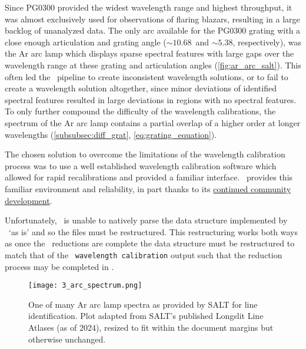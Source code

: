 Since PG$0300$ provided the widest wavelength range and highest throughput, it was almost exclusively used for observations of flaring blazars, resulting in a large backlog of unanalyzed data. The only arc available for the PG$0300$ grating with a close enough articulation and grating angle ($\sim 10.68$\degree\ and $\sim 5.38$\degree, respectively), was the \gls{Ar} arc lamp which displays sparse spectral features with large gaps over the wavelength range at these grating and articulation angles (\autoref{fig:ar_arc_salt}). This often led the \polsalt\ pipeline to create inconsistent wavelength solutions, or to fail to create a wavelength solution altogether, since minor deviations of identified spectral features resulted in large deviations in regions with no spectral features. To only further compound the difficulty of the wavelength calibrations, the spectrum of the \gls{Ar} arc lamp contains a partial overlap of a higher order at longer wavelengths (\autoref{subsubsec:diff_grat}, \autoref{eq:grating_equation}).

The chosen solution to overcome the limitations of the wavelength calibration process was to use a well established wavelength calibration software which allowed for rapid recalibrations and provided a familiar interface. \iraf\ provides this familiar environment and reliability, in part thanks to its \href{https://github.com/iraf-community/iraf}{continued community development}.

Unfortunately, \iraf\ is unable to natively parse the data structure implemented by \polsalt\ `as is' and so the files must be restructured. This restructuring works both ways as once the \iraf\ reductions are complete the data structure must be restructured to match that of the \polsalt\ \texttt{wavelength calibration} output such that the reduction process may be completed in \polsalt.

\begin{figure}[t]
    \centering
    \texttt{[image: 3\_arc\_spectrum.png]}
    \caption{One of many \gls{Ar} arc lamp spectra as provided by \gls{SALT} for line identification. Plot adapted from \gls{SALT}'s published Longslit Line Atlases (as of 2024), resized to fit within the document margins but otherwise unchanged.\protect\footnotemark}
    \label{fig:ar_arc_salt}
\end{figure}

